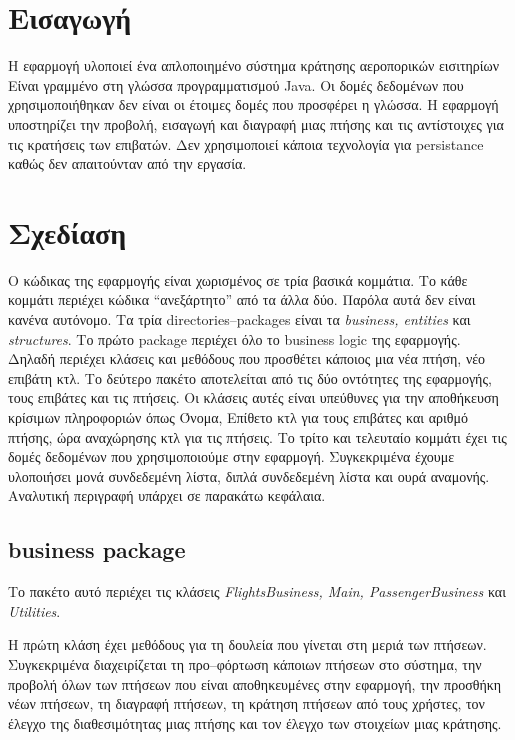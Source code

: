 \documentclass[a4paper]{article}
\begin{document}

\tableofcontents
\newpage
\section{Εισαγωγή}
Η εφαρμογή υλοποιεί ένα απλοποιημένο σύστημα κράτησης αεροπορικών εισιτηρίων
Είναι γραμμένο στη γλώσσα προγραμματισμού Java. Οι δομές δεδομένων που
χρησιμοποιήθηκαν δεν είναι οι έτοιμες δομές που προσφέρει η γλώσσα. Η εφαρμογή
υποστηρίζει την προβολή, εισαγωγή και διαγραφή μιας πτήσης και τις αντίστοιχες
για τις κρατήσεις των επιβατών. Δεν χρησιμοποιεί κάποια τεχνολογία για
persistance καθώς δεν απαιτούνταν από την εργασία.

\section{Σχεδίαση}
Ο κώδικας της εφαρμογής είναι χωρισμένος σε τρία βασικά κομμάτια. Το κάθε
κομμάτι περιέχει κώδικα ``ανεξάρτητο'' από τα άλλα δύο. Παρόλα αυτά δεν είναι
κανένα αυτόνομο. Τα τρία directories--packages είναι τα \emph{business,
entities} και \emph{structures}. Το πρώτο package περιέχει όλο το business logic
της εφαρμογής. Δηλαδή περιέχει κλάσεις και μεθόδους που προσθέτει κάποιος μια
νέα πτήση, νέο επιβάτη κτλ. Το δεύτερο πακέτο αποτελείται από τις δύο οντότητες
της εφαρμογής, τους επιβάτες και τις πτήσεις. Οι κλάσεις αυτές είναι υπεύθυνες
για την αποθήκευση κρίσιμων πληροφοριών όπως Όνομα, Επίθετο κτλ για τους
επιβάτες και αριθμό πτήσης, ώρα αναχώρησης κτλ για τις πτήσεις. Το τρίτο και
τελευταίο κομμάτι έχει τις δομές δεδομένων που χρησιμοποιούμε στην εφαρμογή.
Συγκεκριμένα έχουμε υλοποιήσει μονά συνδεδεμένη λίστα, διπλά συνδεδεμένη λίστα
και ουρά αναμονής. Αναλυτική περιγραφή υπάρχει σε παρακάτω κεφάλαια.

\subsection{business package}
Το πακέτο αυτό περιέχει τις κλάσεις \emph{FlightsBusiness, Main,
PassengerBusiness} και \emph{Utilities}.

Η πρώτη κλάση έχει μεθόδους για τη δουλεία που γίνεται στη μεριά των πτήσεων.
Συγκεκριμένα διαχειρίζεται τη προ--φόρτωση κάποιων πτήσεων στο σύστημα, την
προβολή όλων των πτήσεων που είναι αποθηκευμένες στην εφαρμογή, την προσθήκη
νέων πτήσεων, τη διαγραφή πτήσεων, τη κράτηση πτήσεων από τους χρήστες, τον
έλεγχο της διαθεσιμότητας μιας πτήσης και τον έλεγχο των στοιχείων μιας
κράτησης.
\end{document}
